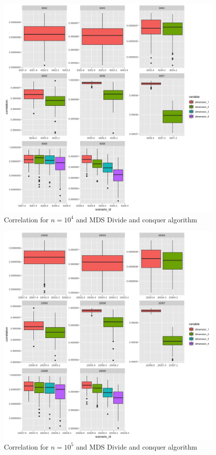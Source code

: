 \documentclass[11pt]{report}
\begin{document}
\begin{figure}[ht]
\centering
    \includegraphics[scale = 1.5]{./images/divide_correlation_10000.png}
    \caption{Correlation for $n = 10^4$ and MDS Divide and conquer algorithm}
    \label{divide_correlation_10000}
\end{figure}

\begin{figure}[ht]
\centering
    \includegraphics[scale = 1.5]{./images/divide_correlation_100000.png}
    \caption{Correlation for $n = 10^5$ and MDS Divide and conquer algorithm}
    \label{divide_correlation_100000}
\end{figure}
\end{document}
